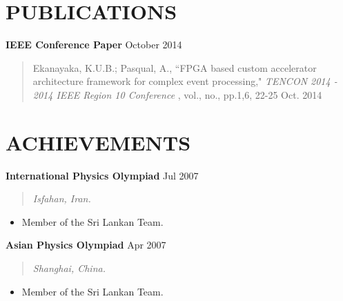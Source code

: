 \documentclass[mm]{./assets/res} %
\begin{document}
\begin{resume}
\vspace {2 mm}
\section{PUBLICATIONS} 

\textbf{IEEE Conference Paper } \hfill October 2014
\begin{quote}
Ekanayaka, K.U.B.; Pasqual, A., ``FPGA based custom accelerator architecture framework for complex event processing," \emph{TENCON 2014 - 2014 IEEE Region 10 Conference} , vol., no., pp.1,6, 22-25 Oct. 2014
\end{quote}
 

\section{ACHIEVEMENTS} 

\textbf{International Physics Olympiad} \hfill Jul 2007
\begin{quote}
\emph{Isfahan, Iran.}
\end{quote}

\begin{itemize} \itemsep -1pt %
\item Member of the Sri Lankan Team.
\end{itemize}

\textbf{Asian Physics Olympiad} \hfill Apr 2007
\begin{quote}
\emph{Shanghai, China.}
\end{quote}

\begin{itemize} \itemsep -1pt %
\item Member of the Sri Lankan Team.
\end{itemize}




\end{resume}
\end{document}
